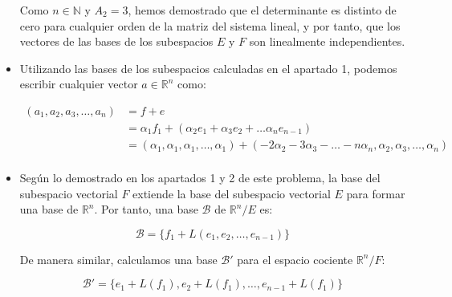 \begin{itemize}[$\bullet$]
    Como $n \in \mathbb{N}$ y $A_{2} = 3$, hemos demostrado que el determinante es distinto de cero para cualquier orden de la matriz
    del sistema lineal, y por tanto, que los vectores de las bases de los subespacios $E$ y $F$ son linealmente independientes.

    \vspace{20px}
    \item Utilizando las bases de los subespacios calculadas en el apartado 1, podemos escribir cualquier vector $a \in \mathbb{R}^n$ como:

    \begin{equation*}
        \begin{split}
        (a_1, a_2, a_3, \ldots, a_n)
            & = f + e \\
            & = \alpha_1 f_1 + (\alpha_2 e_1 + \alpha_3 e_2 + \ldots \alpha_n e_{n-1} ) \\
            & = (\alpha_1, \alpha_1, \alpha_1, \ldots, \alpha_1) +
            (-2\alpha_2-3\alpha_3 - \ldots -n\alpha_n, \alpha_2, \alpha_3, \ldots, \alpha_n)
            \\
        \end{split}
    \end{equation*}


    \vspace{20px}
    \item
    Según lo demostrado en los apartados 1 y 2 de este problema, la base del subespacio vectorial $F$ extiende la base del subespacio vectorial $E$ para formar
    una base de $\mathbb{R}^n$. Por tanto, una base $\mathcal{B}$ de $\mathbb{R}^n/E$ es:

    \begin{equation*}
        \mathcal{B} = \{ f_1 + L(e_1, e_2, \ldots, e_{n-1}) \}

    \end{equation*}

    De manera similar, calculamos una base $\mathcal{B'}$ para el espacio cociente $\mathbb{R}^n/F$:

    \begin{equation*}
        \mathcal{B'} = \{ e_1 + L(f_1) , e_2 + L(f_1) , \ldots, e_{n-1} + L(f_1) \}
    \end{equation*}
\end{itemize}

